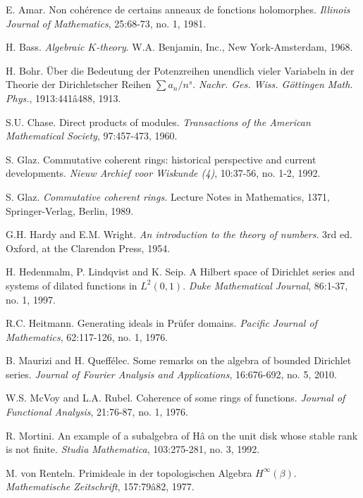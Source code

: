 \documentclass[11pt,reqno]{amsart}
\numberwithin{equation}{section}
\theoremstyle{definition}
\theoremstyle{definition}
\theoremstyle{definition}
\begin{document}
\begin{thebibliography}{10}

E. Amar. 
Non coh\'erence de certains anneaux de fonctions holomorphes. 
{\em Illinois Journal of Mathematics}, 25:68-73, no. 1, 1981. 

H. Bass. 
{\em Algebraic $K$-theory}. 
W.A. Benjamin, Inc., New York-Amsterdam, 1968. 

H. Bohr.  
\"Uber die Bedeutung der Potenzreihen unendlich vieler 
 Variabeln in der Theorie der Dirichletscher Reihen
$\sum a_n /n^{s}$.    
{\em Nachr. Ges. Wiss. G\"ottingen Math. Phys.}, 1913:441â488, 1913.

S.U. Chase.
Direct products of modules.
{\em Transactions of the American Mathematical Society}, 
97:457-473, 1960.

S. Glaz. 
Commutative coherent rings: historical perspective and current developments. 
{\em Nieuw Archief voor Wiskunde (4)}, 10:37-56, no. 1-2, 1992.

S. Glaz.
{\em Commutative coherent rings.}
Lecture Notes in Mathematics, 1371, Springer-Verlag, Berlin, 1989.

G.H. Hardy and E.M. Wright.
{\em An introduction to the theory of numbers}.
3rd ed. Oxford, at the Clarendon Press, 1954.

H. Hedenmalm, P. Lindqvist and K. Seip. 
A {H}ilbert space of {D}irichlet series and systems of dilated 
functions in {$L^2(0,1)$}. 
{\em Duke Mathematical Journal}, 86:1-37, no. 1, 1997.
  
R.C. Heitmann. 
Generating ideals in Pr\"ufer domains.
{\em Pacific Journal of Mathematics},  62:117-126, no. 1, 1976. 
    
B. Maurizi and H. Queff\'elec. 
Some remarks on the algebra of bounded Dirichlet series. 
{\em Journal of Fourier Analysis and Applications}, 16:676-692, no. 5, 2010. 

W.S. McVoy and L.A. Rubel.
Coherence of some rings of functions.
{\em Journal of Functional Analysis}, 21:76-87, no. 1, 1976. 

R. Mortini. 
An example of a subalgebra of Hâ on the unit disk whose stable rank is not finite. 
{\em Studia Mathematica}, 103:275-281, no. 3, 1992. 

M. von Renteln. 
Primideale in der topologischen Algebra $H^\infty(\beta)$. 
{\em Mathematische Zeitschrift}, 157:79â82, 1977.


\end{thebibliography}
\end{document}
